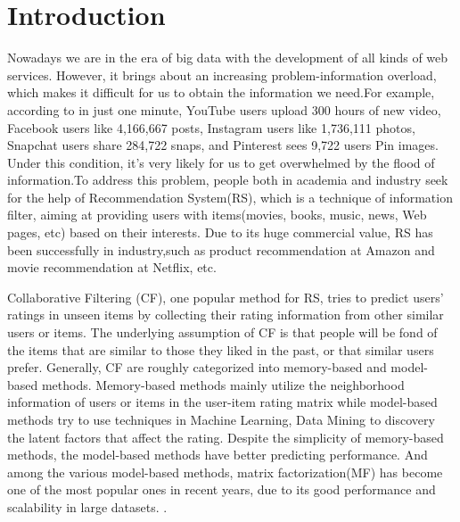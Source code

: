 
\section{Introduction}
Nowadays we are in the era of big data with the development of all kinds of web services. However, it brings about an increasing problem-information overload, which makes it difficult for us to obtain the information we need.For example, according to \cite{stats_url} in just one minute, YouTube users upload 300 hours of new video, Facebook users like 4,166,667 posts, Instagram users like 1,736,111 photos, Snapchat users share 284,722 snaps, and Pinterest sees 9,722 users Pin images. Under this condition, it's very likely for us to get overwhelmed by the flood of information.To address this problem, people both in academia and industry seek for the help of Recommendation System(RS), which is a technique of information filter, aiming at providing users with items(movies, books, music, news, Web pages, etc) based on their interests. Due to its huge commercial value, RS has been successfully in industry,such as product recommendation at Amazon and movie recommendation at Netflix, etc. 

Collaborative Filtering (CF), one popular method for RS, tries to predict users' ratings in unseen items by collecting their rating information from other similar users or items. The underlying assumption of CF is that people will be fond of the items that are similar to those they liked in the past, or that similar users prefer. Generally, CF are roughly categorized into memory-based and model-based methods. Memory-based methods mainly utilize the neighborhood information of users or items in the user-item rating matrix while model-based methods try to use techniques in Machine Learning, Data Mining to discovery the latent factors that affect the rating. Despite the simplicity of memory-based methods, the model-based methods have better predicting performance. And among the various model-based methods, matrix factorization(MF) has become one of the most popular ones in recent years, due to its good performance and scalability in large datasets. \cite{koren2009matrix}\cite{mnih2007probabilistic}.

